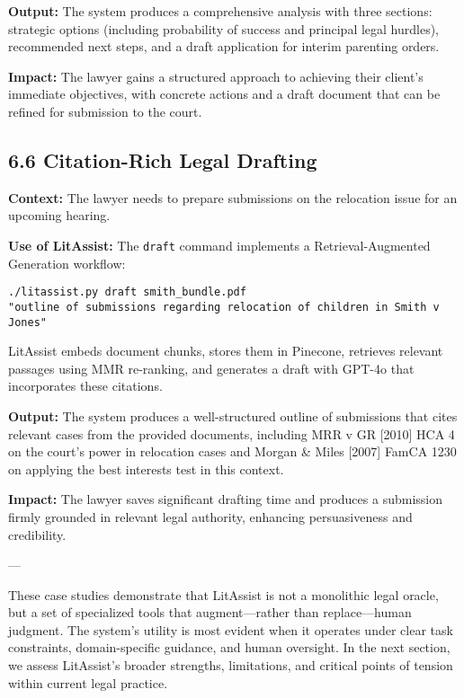 \documentclass[12pt,a4paper]{article}
\begin{document}
\textbf{Output:} The system produces a comprehensive analysis with three sections: strategic options (including probability of success and principal legal hurdles), recommended next steps, and a draft application for interim parenting orders.

\textbf{Impact:} The lawyer gains a structured approach to achieving their client's immediate objectives, with concrete actions and a draft document that can be refined for submission to the court.

\subsection*{6.6 Citation-Rich Legal Drafting}

\textbf{Context:} The lawyer needs to prepare submissions on the relocation issue for an upcoming hearing.

\textbf{Use of LitAssist:} The \texttt{draft} command implements a Retrieval-Augmented Generation workflow:

\begin{verbatim}
./litassist.py draft smith_bundle.pdf 
"outline of submissions regarding relocation of children in Smith v Jones"
\end{verbatim}

LitAssist embeds document chunks, stores them in Pinecone, retrieves relevant passages using MMR re-ranking, and generates a draft with GPT-4o that incorporates these citations.

\textbf{Output:} The system produces a well-structured outline of submissions that cites relevant cases from the provided documents, including MRR v GR [2010] HCA 4 on the court's power in relocation cases and Morgan \& Miles [2007] FamCA 1230 on applying the best interests test in this context.

\textbf{Impact:} The lawyer saves significant drafting time and produces a submission firmly grounded in relevant legal authority, enhancing persuasiveness and credibility.

---

These case studies demonstrate that LitAssist is not a monolithic legal oracle, but a set of specialized tools that augment—rather than replace—human judgment. The system's utility is most evident when it operates under clear task constraints, domain-specific guidance, and human oversight. In the next section, we assess LitAssist's broader strengths, limitations, and critical points of tension within current legal practice.
\end{document}
